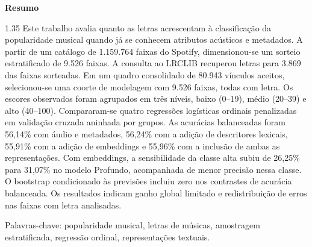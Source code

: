 \thispagestyle{empty}
\vspace*{2.5cm}
\begin{center}
{\Huge\bfseries Resumo}
\end{center}
\vspace{1.5cm}
\begin{spacing}{1.35}
Este trabalho avalia quanto as letras acrescentam à classificação da popularidade musical quando já se conhecem atributos acústicos e metadados. A partir de um catálogo de 1.159.764 faixas do Spotify, dimensionou-se um sorteio estratificado de 9.526 faixas. A consulta ao LRCLIB recuperou letras para 3.869 das faixas sorteadas. Em um quadro consolidado de 80.943 vínculos aceitos, selecionou-se uma coorte de modelagem com 9.526 faixas, todas com letra. Os escores observados foram agrupados em três níveis, baixo (0--19), médio (20--39) e alto (40--100). Compararam-se quatro regressões logísticas ordinais penalizadas em validação cruzada aninhada por grupos. As acurácias balanceadas foram 56,14\% com áudio e metadados, 56,24\% com a adição de descritores lexicais, 55,91\% com a adição de embeddings e 55,96\% com a inclusão de ambas as representações. Com embeddings, a sensibilidade da classe alta subiu de 26,25\% para 31,07\% no modelo Profundo, acompanhada de menor precisão nessa classe. O bootstrap condicionado às previsões incluiu zero nos contrastes de acurácia balanceada. Os resultados indicam ganho global limitado e redistribuição de erros nas faixas com letra analisadas.
\end{spacing}

\vspace{1.5cm}
\noindent Palavras-chave: popularidade musical, letras de músicas, amostragem estratificada, regressão ordinal, representações textuais.

